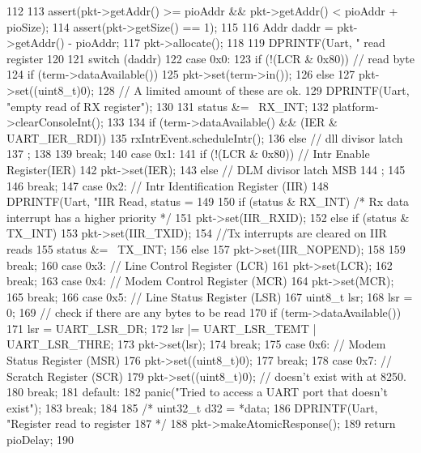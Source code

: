 \begin{DoxyCode}
112 {
113     assert(pkt->getAddr() >= pioAddr && pkt->getAddr() < pioAddr + pioSize);
114     assert(pkt->getSize() == 1);
115 
116     Addr daddr = pkt->getAddr() - pioAddr;
117     pkt->allocate();
118 
119     DPRINTF(Uart, " read register %
120 
121     switch (daddr) {
122         case 0x0:
123             if (!(LCR & 0x80)) { // read byte
124                 if (term->dataAvailable())
125                     pkt->set(term->in());
126                 else {
127                     pkt->set((uint8_t)0);
128                     // A limited amount of these are ok.
129                     DPRINTF(Uart, "empty read of RX register\n");
130                 }
131                 status &= ~RX_INT;
132                 platform->clearConsoleInt();
133 
134                 if (term->dataAvailable() && (IER & UART_IER_RDI))
135                     rxIntrEvent.scheduleIntr();
136             } else { // dll divisor latch
137                ;
138             }
139             break;
140         case 0x1:
141             if (!(LCR & 0x80)) { // Intr Enable Register(IER)
142                 pkt->set(IER);
143             } else { // DLM divisor latch MSB
144                 ;
145             }
146             break;
147         case 0x2: // Intr Identification Register (IIR)
148             DPRINTF(Uart, "IIR Read, status = %
149 
150             if (status & RX_INT) /* Rx data interrupt has a higher priority */
151                 pkt->set(IIR_RXID);
152             else if (status & TX_INT) {
153                 pkt->set(IIR_TXID);
154                 //Tx interrupts are cleared on IIR reads
155                 status &= ~TX_INT;
156             } else
157                 pkt->set(IIR_NOPEND);
158 
159             break;
160         case 0x3: // Line Control Register (LCR)
161             pkt->set(LCR);
162             break;
163         case 0x4: // Modem Control Register (MCR)
164             pkt->set(MCR);
165             break;
166         case 0x5: // Line Status Register (LSR)
167             uint8_t lsr;
168             lsr = 0;
169             // check if there are any bytes to be read
170             if (term->dataAvailable())
171                 lsr = UART_LSR_DR;
172             lsr |= UART_LSR_TEMT | UART_LSR_THRE;
173             pkt->set(lsr);
174             break;
175         case 0x6: // Modem Status Register (MSR)
176             pkt->set((uint8_t)0);
177             break;
178         case 0x7: // Scratch Register (SCR)
179             pkt->set((uint8_t)0); // doesn't exist with at 8250.
180             break;
181         default:
182             panic("Tried to access a UART port that doesn't exist\n");
183             break;
184     }
185 /*    uint32_t d32 = *data;
186     DPRINTF(Uart, "Register read to register %
187 */
188     pkt->makeAtomicResponse();
189     return pioDelay;
190 }
\end{DoxyCode}
